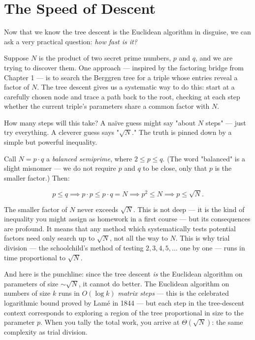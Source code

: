 \bigskip

\section*{The Speed of Descent}

Now that we know the tree descent is the Euclidean algorithm in disguise, we can ask a very practical question: \textit{how fast is it?}

Suppose $N$ is the product of two secret prime numbers, $p$ and $q$, and we are trying to discover them. One approach --- inspired by the factoring bridge from Chapter 1 --- is to search the Berggren tree for a triple whose entries reveal a factor of $N$. The tree descent gives us a systematic way to do this: start at a carefully chosen node and trace a path back to the root, checking at each step whether the current triple's parameters share a common factor with $N$.

How many steps will this take? A naïve guess might say "about $N$ steps" --- just try everything. A cleverer guess says "$\sqrt{N}$." The truth is pinned down by a simple but powerful inequality.

Call $N = p \cdot q$ a \textit{balanced semiprime}, where $2 \le p \le q$. (The word "balanced" is a slight misnomer --- we do not require $p$ and $q$ to be close, only that $p$ is the smaller factor.) Then:

\[
p \le q \implies p \cdot p \le p \cdot q = N \implies p^2 \le N \implies p \le \sqrt{N}.
\]

The smaller factor of $N$ never exceeds $\sqrt{N}$. This is not deep --- it is the kind of inequality you might assign as homework in a first course --- but its consequences are profound. It means that any method which systematically tests potential factors need only search up to $\sqrt{N}$, not all the way to $N$. This is why trial division --- the schoolchild's method of testing $2, 3, 4, 5, \ldots$ one by one --- runs in time proportional to $\sqrt{N}$.

And here is the punchline: since the tree descent \textit{is} the Euclidean algorithm on parameters of size $\sim\!\sqrt{N}$, it cannot do better. The Euclidean algorithm on numbers of size $k$ runs in $O(\log k)$ \textit{matrix steps} --- this is the celebrated logarithmic bound proved by Lamé in 1844 --- but each step in the tree-descent context corresponds to exploring a region of the tree proportional in size to the parameter $p$. When you tally the total work, you arrive at $\Theta(\sqrt{N})$: the same complexity as trial division.

